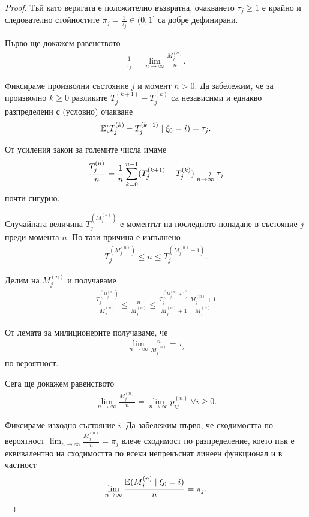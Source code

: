 \documentclass[numbers=endperiod, bibliography=totocnumbered]{scrartcl}
\begin{document}
\begin{proof}
  Тъй като веригата е положително възвратна, очакването \( \tau_j \geq 1 \) е крайно и следователно стойностите \( \pi_j = \frac 1 {\tau_j} \in (0, 1] \) са добре дефинирани.

  Първо ще докажем равенството
  \begin{align*}
    \frac 1 {\tau_j}
    =
    \lim_{n \to \infty} \frac {M^{(n)}_j} n.
  \end{align*}

  Фиксираме произволни състояние \( j \) и момент \( n > 0 \). Да забележим, че за произволно \( k \geq 0 \) разликите \( T_j^{(k+1)} - T_j^{(k)} \) са независими и еднакво разпределени с (условно) очакване
  \begin{align*}
   \Expect(T_j^{(k)} - T_j^{(k-1)} \mid \xi_0 = i) = \tau_j.
  \end{align*}

  От усиления закон за големите числа имаме
  \begin{align*}
    \frac {T_j^{(n)}} n = \frac 1 n \sum_{k=0}^{n-1} (T_j^{(k+1)} - T_j^{(k)}) \Conv[n \to \infty]{} \tau_j
  \end{align*}
  почти сигурно.

  Случайната величина \( T_j^{(M_j^{(n)})} \) е моментът на последното попадане в състояние \( j \) преди момента \( n \). По тази причина е изпълнено
  \begin{align*}
    T_j^{(M_j^{(n)})} \leq n \leq T_j^{(M_j^{(n)} + 1)}.
  \end{align*}

  Делим на \( M_j^{(n)} \) и получаваме
  \begin{align*}
    \frac {T_j^{(M_j^{(n)})}} {M_j^{(n)}} \leq \frac n {M_j^{(n)}} \leq \frac {T_j^{(M_j^{(n)} + 1)}} {M_j^{(n)} + 1} \frac {M_j^{(n)} + 1} {M_j^{(n)}}
  \end{align*}

  От лемата за милиционерите получаваме, че
  \begin{align*}
    \lim_{n \to \infty} \frac n {M^{(n)}_j}
    =
    \tau_j
  \end{align*}
  по вероятност.

  Сега ще докажем равенството
  \begin{align*}
    \lim_{n \to \infty} \frac {M^{(n)}_j} n
    =
    \lim_{n \to \infty} p_{ij}^{(n)}~\forall i \geq 0.
  \end{align*}

  Фиксираме изходно състояние \( i \). Да забележим първо, че сходимостта по вероятност \( \lim_{n \to \infty} \frac {M^{(n)}_j} n = \pi_j \) влече сходимост по разпределение, което пък е еквивалентно на сходимостта по всеки непрекъснат линеен функционал и в частност
  \begin{align*}
    \lim_{n \to \infty} \frac {\Expect(M^{(n)}_j \mid \xi_0 = i)} n = \pi_j.
  \end{align*}


\end{proof}
\end{document}
